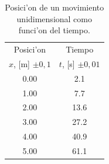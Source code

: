 \documentclass[letterpaper,11pt]{report}
\begin{document}
\begin{table}[h!]
\begin{center}
\begin{tabular}{|c|c|}
\hline 
Posici'on & Tiempo \\ 
$x$, [m] $\pm 0,1$ & $t$, [s] $\pm 0,01$ \\ \hline
0.00 & 2.1 \\ \hline
1.00 & 7.7 \\ \hline
2.00 & 13.6\\ \hline
3.00 & 27.2\\ \hline
4.00 & 40.9\\ \hline
5.00 & 61.1\\ \hline
\end{tabular}
\caption{Posici'on de un movimiento unidimensional como funci'on del tiempo.}
\label{tab-xt}
\end{center}
\end{table}
\end{document}
